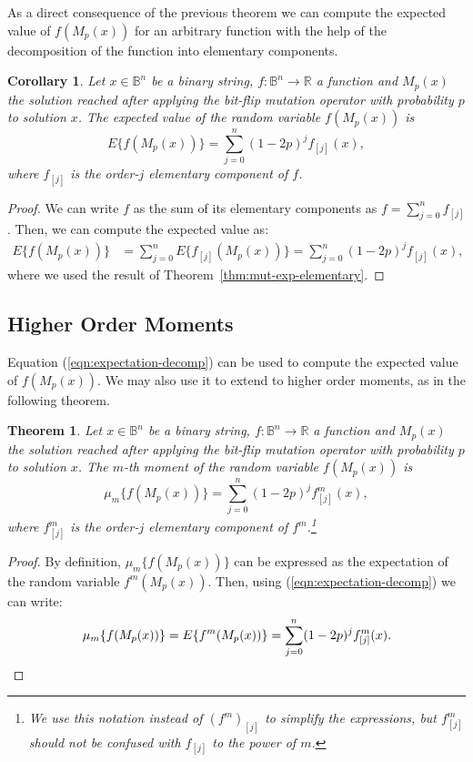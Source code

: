 \documentclass{article}
\newtheorem{theorem}{Theorem}
\newtheorem{corollary}{Corollary}
\newcommand{\Bo}[0]{\mathbb{B}}
\newcommand{\Real}[0]{\mathbb{R}}
\newcommand{\Exp}[1]{E\{#1\}}
\begin{document}
As a direct consequence of the previous theorem we can compute the expected value of $f(M_p(x))$ for an arbitrary function with the help of the decomposition of the function into elementary components.

\begin{corollary}
Let $x \in \Bo^n$ be a binary string, $f:\Bo^n\to \Real$ a function and $M_p(x)$ the solution reached after applying the bit-flip mutation operator with probability $p$ to solution $x$. The expected value of the random variable $f(M_p(x))$ is
\begin{equation}
\label{eqn:expectation-decomp}
\Exp{f(M_p(x))} = \sum_{j=0}^n (1-2p)^j f_{[j]}(x) ,
\end{equation}
where $f_{[j]}$ is the order-$j$ elementary component of $f$.
\end{corollary}
\begin{proof}
We can write $f$ as the sum of its elementary components as $f=\sum_{j=0}^n f_{[j]}$. Then, we can compute the expected value as:
\begin{align}
\Exp{f(M_p(x))} &= \sum_{j=0}^n \Exp{f_{[j]}(M_p(x))} = \sum_{j=0}^n (1-2p)^j f_{[j]}(x),
\end{align}
where we used the result of Theorem~\ref{thm:mut-exp-elementary}.
\end{proof}

\subsection{Higher Order Moments}
\label{subsec:higher-moments}

Equation (\ref{eqn:expectation-decomp}) can be used to compute the expected value of $f(M_p(x))$. We may also use it to extend to higher order moments, as in the following theorem. 
\begin{theorem}
Let $x \in \Bo^n$ be a binary string, $f:\Bo^n\to \Real$ a function and $M_p(x)$ the solution reached after applying the bit-flip mutation operator with probability $p$ to solution $x$. The $m$-th moment of the random variable $f(M_p(x))$ is
\begin{equation}
\label{eqn:cth-order}
\mu_m\{f(M_p(x))\} = \sum_{j=0}^n (1-2p)^j f^m_{[j]}(x) ,
\end{equation}
where $f^m_{[j]}$ is the order-$j$ elementary component of $f^m$.\footnote{We use this notation instead of $(f^m)_{[j]}$ to simplify the expressions, but $f^m_{[j]}$ should not be confused with $f_{[j]}$ to the power of $m$.}
\end{theorem}
\begin{proof}
By definition, $\mu_m\{f(M_p(x))\}$ can be expressed as the expectation of the random variable $f^m(M_p(x))$. Then, using (\ref{eqn:expectation-decomp}) we can write:
\begin{align}
\mu_m\{f(M_p(x))\} = \Exp{f^m(M_p(x))} = \sum_{j=0}^n (1-2p)^j f^m_{[j]}(x) . \notag
\end{align}
\end{proof}
\end{document}
